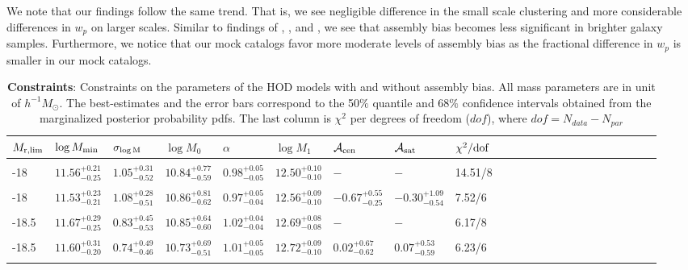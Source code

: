 \documentclass[12pt, preprint]{aastex}
\newcommand{\mzero}{\log M_{0}}
\newcommand{\mone}{\log M_{1}}
\newcommand{\mmin}{\log M_{\rm min}}
\newcommand{\sigmam}{\sigma_{\log \rm M}}
\newcommand{\acen}{\mathcal{A}_{\rm cen}}
\newcommand{\asat}{\mathcal{A}_{\rm sat}}
\begin{document}
We note that our findings follow the same trend. That is, we see negligible difference in the small scale clustering and more considerable differences in $w_{p}$ on larger scales. Similar to findings of \citet{arz2014}, \citet{lehman2015}, and \citet{edHOD-weinberg}, we see that assembly bias becomes less significant in brighter galaxy samples. Furthermore, we notice that our mock catalogs favor more moderate levels of assembly bias as the fractional difference in $w_{p}$ is smaller in our mock catalogs. 

\begin{table}
\begin{center}
  \label{tab:constraints}
 \caption{{\bf Constraints}: Constraints on the parameters of the HOD models with and without assembly bias. 
All mass parameters are in unit of $h^{-1}M_\odot$. The best-estimates and the error bars correspond to the 50$\%$ quantile and 68$\%$ confidence intervals obtained from the marginalized posterior probability pdfs. The last column is $\chi^{2}$ per degrees of freedom ($dof$), where $dof = N_{data} - N_{par}$}
\begin{tabular}{@{}lllllllllllllllllllllll}
\hline 
   $M_{\rm r,lim}$ & $\mmin$ & $\sigmam$ & $\mzero$ & $\alpha$ &  $\mone$ & $\acen$ & $\asat$ & $\chi^{2}/\rm{dof}$ \\  \hline
  \\ 
 -18 & $11.56^{+0.21}_{-0.25}$ &  $1.05^{+0.31}_{-0.52}$ & $10.84^{+0.77}_{-0.59}$ & $0.98^{+0.05}_{-0.05}$ &  $12.50^{+0.10}_{-0.10}$ & $-$ & $-$ & 14.51/8\\\\
     
  -18 & $11.53^{+0.23}_{-0.21}$ &  $1.08^{+0.28}_{-0.51}$ & $10.86^{+0.81}_{-0.62}$ & $0.97^{+0.05}_{-0.04}$ &  $12.56^{+0.09}_{-0.10}$ & $-0.67^{+0.55}_{-0.25}$ & $-0.30^{+1.09}_{-0.54}$ & 7.52/6\\ \\
     
-18.5 & $11.67^{+0.29}_{-0.25}$ &  $0.83^{+0.45}_{-0.53}$ & $10.85^{+0.64}_{-0.60}$ & $1.02^{+0.04}_{-0.04}$ &  $12.69^{+0.08}_{-0.08}$ & $-$ & $-$ & 6.17/8\\ \\
    
-18.5 & $11.60^{+0.31}_{-0.20}$ &  $0.74^{+0.49}_{-0.46}$ & $10.73^{+0.69}_{-0.51}$ & $1.01^{+0.05}_{-0.05}$ &  $12.72^{+0.09}_{-0.10}$ & $0.02^{+0.67}_{-0.62}$ & $0.07^{+0.53}_{-0.59}$ & 6.23/6\\ \\


\end{tabular}
\end{center}
\end{table}
\end{document}
